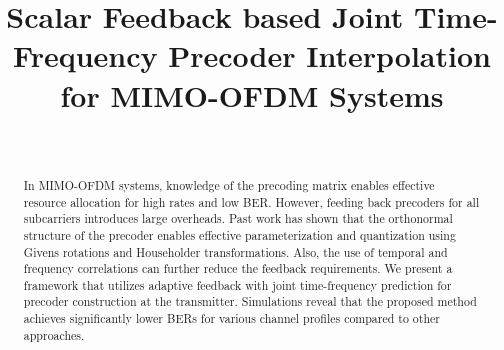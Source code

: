 \documentclass[journal,10pt,twocolumn]{IEEEtran}
\begin{document}

\title{Scalar Feedback based Joint Time-Frequency Precoder
  Interpolation for  MIMO-OFDM Systems}


 \author{
 \
\vspace{-2.3\baselineskip}
}
\maketitle

\thispagestyle{plain}



\begin{abstract}

  In MIMO-OFDM systems, knowledge of the precoding matrix enables
  effective resource allocation for high rates and low BER. However,
  feeding back precoders for all subcarriers introduces large
  overheads. Past work has shown that the orthonormal structure of the
  precoder enables effective parameterization and quantization using
  Givens rotations and Householder transformations. Also, the use of
  temporal and frequency correlations can further reduce the feedback
  requirements. We present a framework that utilizes adaptive feedback
  with joint time-frequency prediction for precoder construction at
  the transmitter.  Simulations reveal that the proposed method
  achieves significantly lower BERs for various channel profiles
  compared to other approaches.
\end{abstract}
\end{document}
